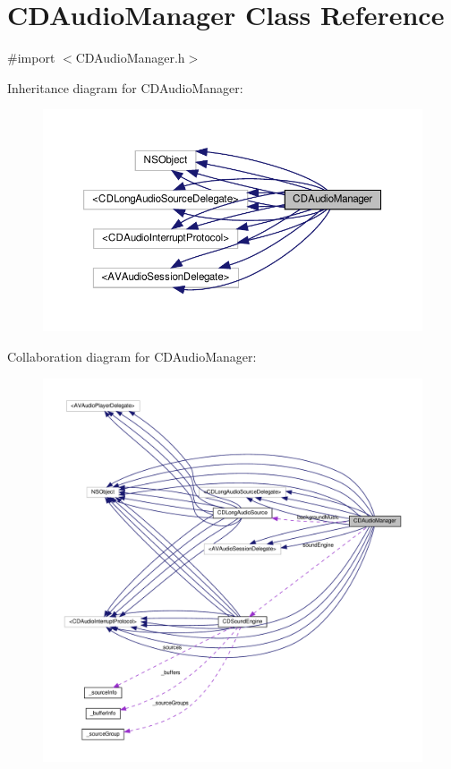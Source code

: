 \hypertarget{interfaceCDAudioManager}{}\section{C\+D\+Audio\+Manager Class Reference}
\label{interfaceCDAudioManager}


{\ttfamily \#import $<$C\+D\+Audio\+Manager.\+h$>$}



Inheritance diagram for C\+D\+Audio\+Manager\+:
\nopagebreak
\begin{figure}[H]
\begin{center}
\leavevmode
\includegraphics[width=350pt]{interfaceCDAudioManager__inherit__graph}
\end{center}
\end{figure}


Collaboration diagram for C\+D\+Audio\+Manager\+:
\nopagebreak
\begin{figure}[H]
\begin{center}
\leavevmode
\includegraphics[width=350pt]{interfaceCDAudioManager__coll__graph}
\end{center}
\end{figure}
